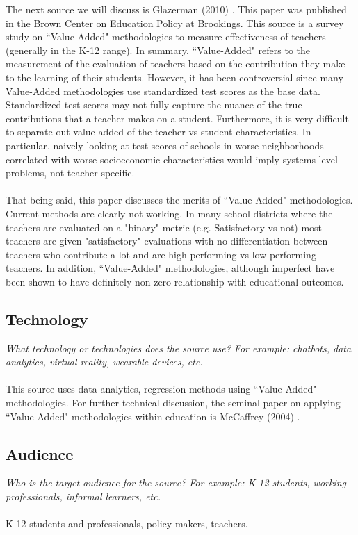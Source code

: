 \documentclass[12pt, final]{article}
\begin{document}
The next source we will discuss is Glazerman (2010) \cite{Glazerman}. This paper was published in the Brown Center on Education Policy at Brookings. This source is a survey study on ``Value-Added" methodologies to measure effectiveness of teachers (generally in the K-12 range). In summary, ``Value-Added" refers to the measurement of the evaluation of teachers based on the contribution they make to the learning of their students. However, it has been controversial since many Value-Added methodologies use standardized test scores as the base data. Standardized test scores may not fully capture the nuance of the true contributions that a teacher makes on a student. Furthermore, it is very difficult to separate out value added of the teacher vs student characteristics. In particular, naively looking at test scores of schools in worse neighborhoods correlated with worse socioeconomic characteristics would imply systems level problems, not teacher-specific.
\\
\\
That being said, this paper discusses the merits of ``Value-Added" methodologies. Current methods are clearly not working. In many school districts where the teachers are evaluated on a "binary" metric (e.g. Satisfactory vs not) most teachers are given "satisfactory" evaluations with no differentiation between teachers who contribute a lot and are high performing vs low-performing teachers. In addition, ``Value-Added" methodologies, although imperfect have been shown to have definitely non-zero relationship with educational outcomes. 

\subsection{Technology}
\textit{What technology or technologies does the source use? For example: chatbots, data analytics, virtual reality, wearable devices, etc.}
\\
\\
This source uses data analytics, regression methods using ``Value-Added" methodologies. For further technical discussion, the seminal paper on applying ``Value-Added" methodologies within education is McCaffrey (2004) \cite{McCaffrey}.

\subsection{Audience}
\textit{Who is the target audience for the source? For example: K-12 students, working professionals, informal learners, etc.}
\\
\\
K-12 students and professionals, policy makers, teachers.
\end{document}
